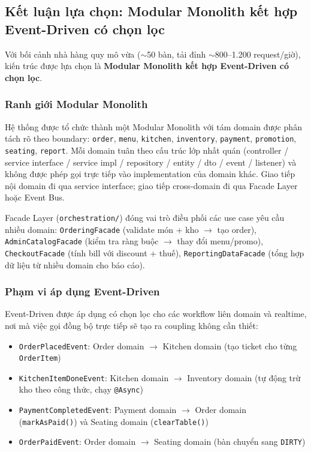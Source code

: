 \subsection{Kết luận lựa chọn: Modular Monolith kết hợp Event-Driven có chọn lọc}
 
Với bối cảnh nhà hàng quy mô vừa ($\sim$50 bàn, tải đỉnh $\sim$800--1.200 request/giờ), kiến trúc được lựa chọn là \textbf{Modular Monolith kết hợp Event-Driven có chọn lọc}.
 
\subsubsection{Ranh giới Modular Monolith}
 
Hệ thống được tổ chức thành một Modular Monolith với tám domain được phân tách rõ theo boundary: \texttt{order}, \texttt{menu}, \texttt{kitchen}, \texttt{inventory}, \texttt{payment}, \texttt{promotion}, \texttt{seating}, \texttt{report}. Mỗi domain tuân theo cấu trúc lớp nhất quán (controller / service interface / service impl / repository / entity / dto / event / listener) và không được phép gọi trực tiếp vào implementation của domain khác. Giao tiếp nội domain đi qua service interface; giao tiếp cross-domain đi qua Facade Layer hoặc Event Bus.
 
Facade Layer (\texttt{orchestration/}) đóng vai trò điều phối các use case yêu cầu nhiều domain: \texttt{OrderingFacade} (validate món + kho $\rightarrow$ tạo order), \texttt{AdminCatalogFacade} (kiểm tra ràng buộc $\rightarrow$ thay đổi menu/promo), \texttt{CheckoutFacade} (tính bill với discount + thuế), \texttt{ReportingDataFacade} (tổng hợp dữ liệu từ nhiều domain cho báo cáo).
 
\subsubsection{Phạm vi áp dụng Event-Driven}
 
Event-Driven được áp dụng có chọn lọc cho các workflow liên domain và realtime, nơi mà việc gọi đồng bộ trực tiếp sẽ tạo ra coupling không cần thiết:
 
\begin{itemize}
  \item \texttt{OrderPlacedEvent}: Order domain $\rightarrow$ Kitchen domain (tạo ticket cho từng \texttt{OrderItem})
  \item \texttt{KitchenItemDoneEvent}: Kitchen domain $\rightarrow$ Inventory domain (tự động trừ kho theo công thức, chạy \texttt{@Async})
  \item \texttt{PaymentCompletedEvent}: Payment domain $\rightarrow$ Order domain (\texttt{markAsPaid()}) và Seating domain (\texttt{clearTable()})
  \item \texttt{OrderPaidEvent}: Order domain $\rightarrow$ Seating domain (bàn chuyển sang \texttt{DIRTY})
\end{itemize}
 
